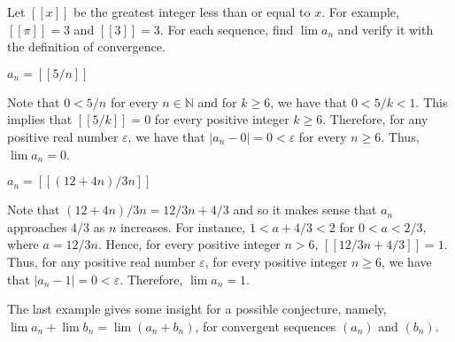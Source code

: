 \documentclass[12pt]{article}
\newcommand{\N}{\mathbb{N}}
\newenvironment{problem}[2][Problem]{\begin{trivlist} \item[\hskip \labelsep {\bfseries #1}\hskip \labelsep {\bfseries #2.}]}{\end{trivlist}}
\newenvironment{solution}[1][Solution]{\begin{trivlist} \item[\hskip \labelsep {\bfseries #1}]}{\end{trivlist}}
\begin{document}
    \begin{problem}{2.2.5}
      Let $\left[ \left[ x \right] \right]$ be the greatest integer less than or equal to $x$. For example, $\left[ \left[ \pi \right] \right]=3$ and $\left[ \left[ 3 \right] \right]=3$. For each sequence, find $\lim a_{n}$ and verify it with the definition of convergence.
      \begin{enumerate}[label=(\alph*)]
      \item $a_{n}=\left[ \left[ 5/n \right] \right]$
    \begin{solution}
      Note that $0<5/n$ for every $n\in\N$ and for $k\geq 6$, we have that $0<5/k<1$. This implies that $\left[ \left[ 5/k \right]\right]=0$ for every positive integer $k\geq 6$. Therefore, for any positive real number $\varepsilon$, we have that $|a_{n}-0| = 0 < \varepsilon$ for every $n\geq 6$. Thus, $\lim a_{n}=0$.
    \end{solution}
      \item $a_{n} = \left[ \left[ \left( 12+4n \right)/3n \right] \right]$
    \begin{solution}
      Note that $\left( 12+4n \right)/3n = 12/3n + 4/3$ and so it makes sense that $a_{n}$ approaches $4/3$ as $n$ increases. For instance, $1<a + 4/3<2$ for $0<a < 2/3$, where $a=12/3n$. Hence, for every positive integer $n>6$, $[[12/3n+4/3]] = 1$. Thus, for any positive real number $\varepsilon$, for every positive integer $n\geq 6$, we have that $|a_{n} - 1| = 0 < \varepsilon$. Therefore, $\lim a_{n} = 1$.    
    \end{solution}
    \end{enumerate}
    The last example gives some insight for a possible conjecture, namely, $\lim a_{n} + \lim b_{n} = \lim(a_{n}+b_{n})$, for convergent sequences $(a_{n})$ and $(b_{n})$.
    \end{problem}
       
\end{document}

